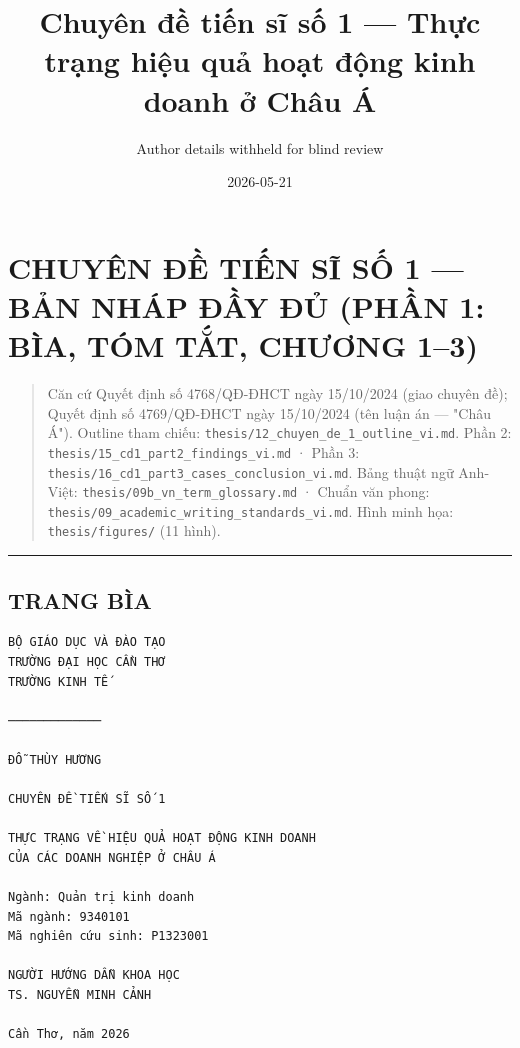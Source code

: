 \documentclass[12pt,a4paper]{article}
\title{Chuyên đề tiến sĩ số 1 --- Thực trạng hiệu quả hoạt động kinh
doanh ở Châu Á}
\author{Author details withheld for blind review}
\date{2026-05-21}
\begin{document}
\maketitle

\hypertarget{chuyuxean-ux111ux1ec1-tiux1ebfn-sux129-sux1ed1-1--bux1ea3n-nhuxe1p-ux111ux1ea7y-ux111ux1ee7-phux1ea7n-1-buxeca-tuxf3m-tux1eaft-chux1b0ux1a1ng-13}{%
\section{CHUYÊN ĐỀ TIẾN SĨ SỐ 1 --- BẢN NHÁP ĐẦY ĐỦ (PHẦN 1: BÌA, TÓM
TẮT, CHƯƠNG
1--3)}\label{chuyuxean-ux111ux1ec1-tiux1ebfn-sux129-sux1ed1-1--bux1ea3n-nhuxe1p-ux111ux1ea7y-ux111ux1ee7-phux1ea7n-1-buxeca-tuxf3m-tux1eaft-chux1b0ux1a1ng-13}}

\begin{quote}
Căn cứ Quyết định số 4768/QĐ-ĐHCT ngày 15/10/2024 (giao chuyên đề);
Quyết định số 4769/QĐ-ĐHCT ngày 15/10/2024 (tên luận án --- "Châu Á").
Outline tham chiếu: \texttt{thesis/12\_chuyen\_de\_1\_outline\_vi.md}.
Phần 2: \texttt{thesis/15\_cd1\_part2\_findings\_vi.md} · Phần 3:
\texttt{thesis/16\_cd1\_part3\_cases\_conclusion\_vi.md}. Bảng thuật ngữ
Anh-Việt: \texttt{thesis/09b\_vn\_term\_glossary.md} · Chuẩn văn phong:
\texttt{thesis/09\_academic\_writing\_standards\_vi.md}. Hình minh họa:
\texttt{thesis/figures/} (11 hình).
\end{quote}

\begin{center}\rule{0.5\linewidth}{0.5pt}\end{center}

\hypertarget{trang-buxeca}{%
\subsection{TRANG BÌA}\label{trang-buxeca}}

\begin{verbatim}
BỘ GIÁO DỤC VÀ ĐÀO TẠO
TRƯỜNG ĐẠI HỌC CẦN THƠ
TRƯỜNG KINH TẾ

─────────────

ĐỖ THÙY HƯƠNG

CHUYÊN ĐỀ TIẾN SĨ SỐ 1

THỰC TRẠNG VỀ HIỆU QUẢ HOẠT ĐỘNG KINH DOANH
CỦA CÁC DOANH NGHIỆP Ở CHÂU Á

Ngành: Quản trị kinh doanh
Mã ngành: 9340101
Mã nghiên cứu sinh: P1323001

NGƯỜI HƯỚNG DẪN KHOA HỌC
TS. NGUYỄN MINH CẢNH

Cần Thơ, năm 2026
\end{verbatim}
\end{document}
